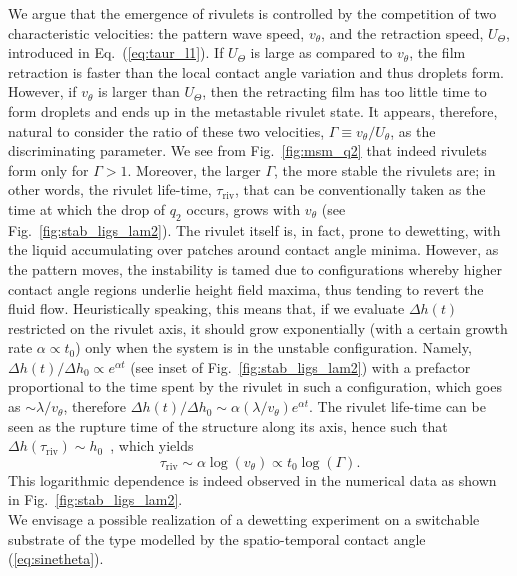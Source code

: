 \documentclass[amsmath,amssymb,showpacs,prf,superscriptaddress, longbibliography]{revtex4-1} %
\begin{document}
We argue that the emergence of rivulets is controlled by the competition of two characteristic velocities: the pattern wave speed, $v_{\theta}$, and the retraction speed, $U_{\Theta}$, introduced in Eq.~(\ref{eq:taur_l1}). 
If $U_{\Theta}$ is large as compared to $v_{\theta}$, the film retraction is faster than the local contact angle variation and thus droplets form. 
However, if $v_{\theta}$ is larger than $U_{\Theta}$, then the retracting film has too little time to form droplets and ends up in the metastable rivulet state. 
It appears, therefore, natural to consider the ratio of these two velocities, $\Gamma \equiv v_{\theta}/U_{\theta}$, as the discriminating parameter.
We see from Fig.~\ref{fig:msm_q2} that indeed rivulets form only for $\Gamma > 1$. 
Moreover, the larger $\Gamma$, the more stable the rivulets are; in other words, the rivulet life-time, $\tau_{\text{riv}}$, that can be conventionally taken as the time at which the drop of $q_2$ occurs, grows with $v_{\theta}$ (see Fig.~\ref{fig:stab_ligs_lam2}).
The rivulet itself is, in fact, prone to dewetting, with the liquid accumulating over patches around contact angle minima. However, as the pattern moves, the instability is tamed due to configurations whereby higher contact angle regions underlie height field maxima, thus tending to revert the fluid flow.
Heuristically speaking, this means that, if we evaluate $\Delta h(t)$ restricted on the rivulet axis, it should grow exponentially (with a certain growth rate $\alpha \propto t_0$) only when the system is in the unstable configuration. Namely, $\Delta h(t)/\Delta h_0 \propto e^{\alpha t}$ (see inset of Fig.~\ref{fig:stab_ligs_lam2}) with a prefactor proportional to the time spent by the rivulet in such a configuration, which goes as $\sim \lambda/v_{\theta}$, therefore 
$\Delta h(t)/\Delta h_0 \sim \alpha (\lambda/v_{\theta})e^{\alpha t}$. 
The rivulet life-time can be seen as the rupture time of the structure along its axis, hence such that $\Delta h (\tau_{\text{riv}}) \sim h_0$~\cite{zitzLatticeBoltzmannSimulations2021}, which yields
\begin{equation}\label{eq:rivlt}
    \tau_{\text{riv}} \sim \alpha \log(v_{\theta}) \propto t_0 \log(\Gamma). 
\end{equation}
This logarithmic dependence is indeed observed in the numerical data as shown in Fig.~\ref{fig:stab_ligs_lam2}.\\
We envisage a possible realization of a dewetting experiment on a switchable substrate of the type modelled by the spatio-temporal contact angle (\ref{eq:sinetheta}). 
\end{document}
